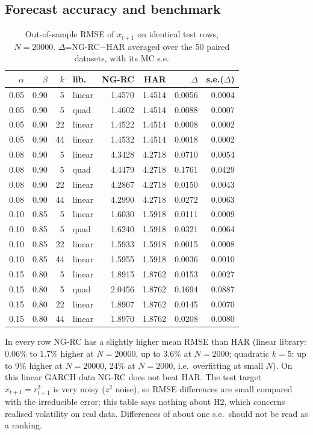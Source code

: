 \documentclass[11pt]{article}
\begin{document}
\subsection{Forecast accuracy and benchmark}
\begin{table}[!htbp]\centering\small\caption{Out-of-sample RMSE of $x_{t+1}$ on identical test rows, $N=20000$. $\Delta$=NG-RC$-$HAR averaged over the 50 paired datasets, with its MC s.e.}\label{t2}
\begin{tabular}{rrrlrrrr}\hline$\alpha$&$\beta$&$k$&lib.&NG-RC&HAR&$\Delta$&s.e.($\Delta$)\\\hline
0.05 & 0.90 & 5 & linear & 1.4570 & 1.4514 & 0.0056 & 0.0004 \\
0.05 & 0.90 & 5 & quad & 1.4602 & 1.4514 & 0.0088 & 0.0007 \\
0.05 & 0.90 & 22 & linear & 1.4522 & 1.4514 & 0.0008 & 0.0002 \\
0.05 & 0.90 & 44 & linear & 1.4532 & 1.4514 & 0.0018 & 0.0002 \\
0.08 & 0.90 & 5 & linear & 4.3428 & 4.2718 & 0.0710 & 0.0054 \\
0.08 & 0.90 & 5 & quad & 4.4479 & 4.2718 & 0.1761 & 0.0429 \\
0.08 & 0.90 & 22 & linear & 4.2867 & 4.2718 & 0.0150 & 0.0043 \\
0.08 & 0.90 & 44 & linear & 4.2990 & 4.2718 & 0.0272 & 0.0063 \\
0.10 & 0.85 & 5 & linear & 1.6030 & 1.5918 & 0.0111 & 0.0009 \\
0.10 & 0.85 & 5 & quad & 1.6240 & 1.5918 & 0.0321 & 0.0064 \\
0.10 & 0.85 & 22 & linear & 1.5933 & 1.5918 & 0.0015 & 0.0008 \\
0.10 & 0.85 & 44 & linear & 1.5955 & 1.5918 & 0.0036 & 0.0010 \\
0.15 & 0.80 & 5 & linear & 1.8915 & 1.8762 & 0.0153 & 0.0027 \\
0.15 & 0.80 & 5 & quad & 2.0456 & 1.8762 & 0.1694 & 0.0887 \\
0.15 & 0.80 & 22 & linear & 1.8907 & 1.8762 & 0.0145 & 0.0070 \\
0.15 & 0.80 & 44 & linear & 1.8970 & 1.8762 & 0.0208 & 0.0080 \\
\hline\end{tabular}\end{table}
In every row NG-RC has a slightly higher mean RMSE than HAR (linear library: 0.06\% to 1.7\% higher at $N=20000$, up to 3.6\% at $N=2000$; quadratic $k=5$: up to 9\% higher at $N=20000$, 24\% at $N=2000$, i.e.\ overfitting at small $N$). On this linear GARCH data NG-RC does not beat HAR. The test target $x_{t+1}=r_{t+1}^2$ is very noisy ($z^2$ noise), so RMSE differences are small compared with the irreducible error; this table says nothing about H2, which concerns realised volatility on real data. Differences of about one s.e.\ should not be read as a ranking.
\end{document}
